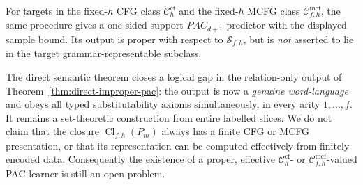 \begin{corollary}
\label{cor:grammar-subclass-semantic-proper}
For targets in the fixed-\(h\) CFG class
\(\mathcal C_h^{\mathrm{cf}}\) and the fixed-\(h\)
MCFG class \(\mathcal C_{f,h}^{\mathrm{mcf}}\),
the same procedure gives a one-sided
support-\(PAC_{d+1}\) predictor with the displayed
sample bound.  Its output is proper with respect to
\(\mathcal S_{f,h}\), but is \emph{not} asserted to lie
in the target grammar-representable subclass.
\end{corollary}

\begin{remark}
\label{rem:semantic-vs-grammar-proper}
The direct semantic theorem closes a logical gap in the
relation-only output of
Theorem~\ref{thm:direct-improper-pac}: the output is now a
\emph{genuine word-language} and obeys all typed
substitutability axioms simultaneously, in every arity
\(1,\ldots,f\).  It remains a set-theoretic construction
from entire labelled slices.  We do not claim that the
closure \(\operatorname{Cl}_{f,h}(P_m)\) always has a
finite CFG or MCFG presentation, or that its representation
can be computed effectively from finitely encoded data.
Consequently the existence of a proper, effective
\(\mathcal C_h^{\mathrm{cf}}\)- or
\(\mathcal C_{f,h}^{\mathrm{mcf}}\)-valued PAC learner
is still an open problem.
\end{remark}

